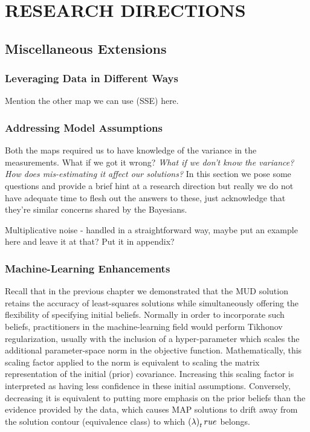 \chapter{\uppercase{Research Directions} \label{chapter:05}}



\FloatBarrier


\FloatBarrier


\FloatBarrier

\section{Miscellaneous Extensions}


\subsection{Leveraging Data in Different Ways}\label{sec:ch05-data}
Mention the other map we can use (SSE) here.

\subsection{Addressing Model Assumptions}\label{sec:ch05-variance}
Both the maps required us to have knowledge of the variance in the measurements.
What if we got it wrong?
\emph{What if we don't know the variance? How does mis-estimating it affect our solutions?}
In this section we pose some questions and provide a brief hint at a research direction but really we do not have adequate time to flesh out the answers to these, just acknowledge that they're similar concerns shared by the Bayesians.

Multiplicative noise - handled in a straightforward way, maybe put an example here and leave it at that? Put it in appendix?


\subsection{Machine-Learning Enhancements}\label{sec:ch05-ml}

Recall that in the previous chapter we demonstrated that the MUD solution retains the accuracy of least-squares solutions while simultaneously offering the flexibility of specifying initial beliefs.
Normally in order to incorporate such beliefs, practitioners in the machine-learning field would perform Tikhonov regularization, usually with the inclusion of a hyper-parameter which scales the additional parameter-space norm in the objective function.
Mathematically, this scaling factor applied to the norm is equivalent to scaling the matrix representation of the initial (prior) covariance.
Increasing this scaling factor is interpreted as having less confidence in these initial assumptions.
Conversely, decreasing it is equivalent to putting more emphasis on the prior beliefs than the evidence provided by the data, which causes MAP solutions to drift away from the solution contour (equivalence class) to which $\left ( \lambda \right )_true$ belongs.

